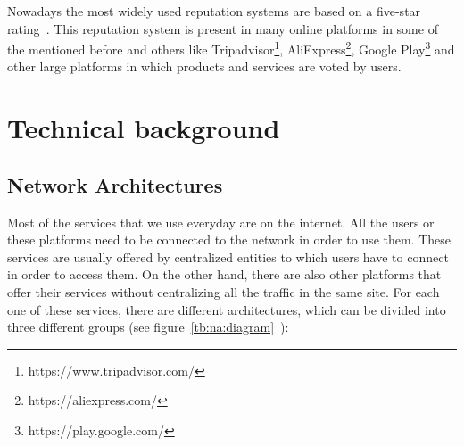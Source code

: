 Nowadays the most widely used reputation systems are based on a five-star
rating~\cite{kinateder2003architecture}. This reputation system is present in
many online platforms in some of the mentioned before and others like
Tripadvisor\footnote{https://www.tripadvisor.com/},
AliExpress\footnote{https://aliexpress.com/}, Google
Play\footnote{https://play.google.com/} and other large platforms in which
products and services are voted by users.

\section{Technical background}
\label{tb}
\subsection{Network Architectures}
\label{tb:na}

Most of the services that we use everyday are on the internet. All the users or
these platforms need to be connected to the network in order to use them. These
services are usually offered by centralized entities to which users have to
connect in order to access them. On the other hand, there are also other
platforms that offer their services without centralizing all the traffic in the
same site. For each one of these services, there are different architectures,
which can be divided into three different groups (see
figure~\ref{tb:na:diagram}~\cite{baran1964distributed}):

